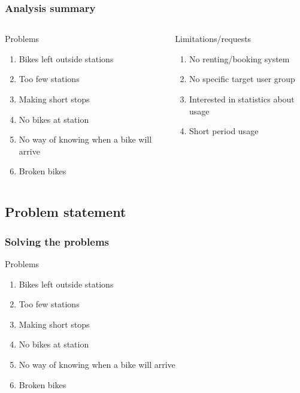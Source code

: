 \begin{frame}
\frametitle{Analysis summary}
\begin{columns}
\begin{column}{.5\textwidth}
\begin{block}{Problems}
\begin{enumerate}
\item Bikes left outside stations
\item Too few stations
\item Making short stops
\item No bikes at station
\item No way of knowing when a bike will arrive
\item Broken bikes
\end{enumerate}
\end{block}
\end{column}
\begin{column}{.5\textwidth}
\begin{block}{Limitations/requests}
\begin{enumerate}
\item No renting/booking system
\item No specific target user group
\item Interested in statistics about usage
\item Short period usage
\end{enumerate}
\end{block}
\end{column}
\end{columns}
\end{frame}

\subsection{Problem statement}

\begin{frame}
\frametitle{Solving the problems}
\begin{block}{Problems}
\begin{enumerate}
\item<1> Bikes left outside stations
\item<1> Too few stations
\item<1> Making short stops
\item<1> No bikes at station
\item<2> No way of knowing when a bike will arrive
\item<1> Broken bikes
\end{enumerate}
\end{block}
\end{frame}


